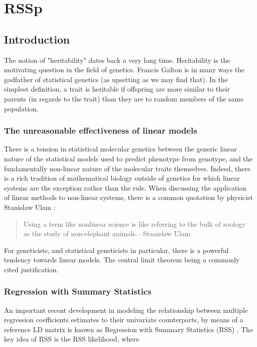 \chapter{RSSp}



\section{Introduction}\label{sec:org3c6cf58}

The notion of "heritability" dates back a very long time. Heritability is the motivating question in the field of genetics.  Francis Galton is in many ways the  godfather of statistical genetics (as upsetting as we may find that).
In the simplest definition, a trait is heritable if offspring are more similar to their parents (in regards to the trait) than they are to random members of the same population.  

\subsection{The unreasonable effectiveness of linear models}\label{sec:orgd56a398}

There is a tension in statistical molecular genetics between the generic linear nature of the statistical models used to predict phenotype from genotype, and the fundamentally non-linear nature of the molecular traits themselves.  Indeed, there is a 
rich tradition of mathematical biology outside of genetics for which linear systems are the exception rather than the rule.  When discussing the application of linear methods to non-linear systems, there is a common quotation by physicist Stanislaw Ulam \cite{Campbell_2004} :

\begin{quote}
Using a term like nonlinear science is like referring to the bulk of zoology as the study of non-elephant animals. --Stanislaw Ulam
\end{quote}

For geneticists, and statistical geneticists in particular, there is a powerful tendency towards linear models.  The central limit theorem being a commonly cited justification.  


\subsection{Regression with Summary Statistics}\label{sec:org859ce76}

An important recent development in modeling the relationship between multiple regression coefficients estimates to their univariate counterparts, by means of a reference LD matrix is known as Regression with Summary Statistics (RSS)
\cite{Zhu_2017}.  The key idea of RSS is the RSS likelihood, where 

